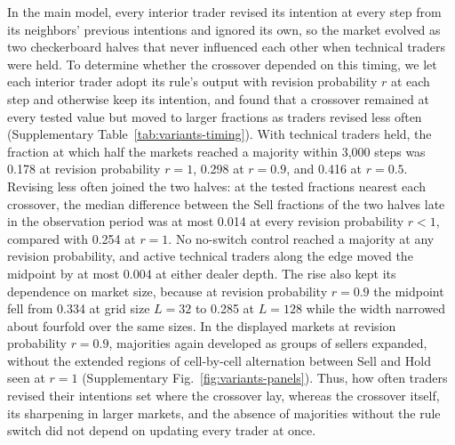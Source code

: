 In the main model, every interior trader revised its intention at every
step from its neighbors' previous intentions and ignored its own, so the
market evolved as two checkerboard halves that never influenced each
other when technical traders were held. To determine whether the
crossover depended on this timing, we let each interior trader adopt its
rule's output with revision probability $r$ at each step and otherwise
keep its intention, and found that a crossover remained at every tested
value but moved to larger fractions as traders revised less often
(Supplementary Table~\ref{tab:variants-timing}). With
technical traders held, the fraction at which half the markets reached a
majority within 3,000 steps was 0.178 at revision probability $r=1$,
0.298 at $r=0.9$, and 0.416 at $r=0.5$. Revising less often joined the
two halves: at the tested fractions nearest each crossover, the median
difference between the Sell fractions of the two halves late in the
observation period was at most 0.014 at every revision probability
$r<1$, compared with 0.254 at $r=1$. No no-switch control reached a majority at any
revision probability, and active technical traders along the edge moved
the midpoint by at most 0.004 at either dealer depth. The rise also kept
its dependence on market size, because at revision probability $r=0.9$
the midpoint fell from 0.334 at grid size $L=32$ to 0.285 at $L=128$
while the width narrowed about fourfold over the same sizes. In the
displayed markets at revision probability $r=0.9$, majorities again
developed as groups of sellers expanded, without the extended regions of
cell-by-cell alternation between Sell and Hold seen at $r=1$
(Supplementary Fig.~\ref{fig:variants-panels}).
Thus, how
often traders revised their intentions set where the crossover lay,
whereas the crossover itself, its sharpening in larger markets, and the
absence of majorities without the rule switch did not depend on updating
every trader at once.

